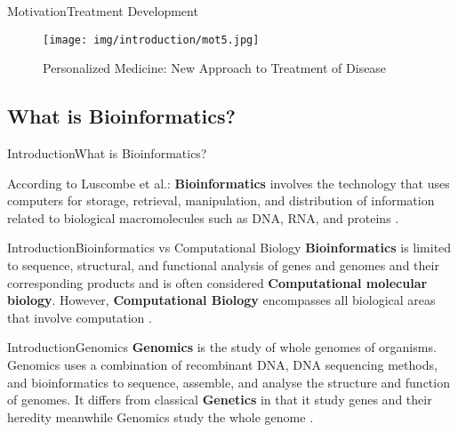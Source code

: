 \documentclass[10pt]{beamer}
\newcommand{\1}{
        	\setbeamertemplate{background}{
        		\texttt{[image: img/1]}
        		\tikz[overlay] \fill[fill opacity=0.75,fill=white] (0,0) rectangle (-\paperwidth,\paperheight);
        	}
}
\begin{document}
\begin{frame}{Motivation}{Treatment Development}
	\begin{figure}[]
		\centering
		\texttt{[image: img/introduction/mot5.jpg]}
		\label{img:mot2}
		\caption{Personalized Medicine: New Approach to Treatment of Disease}
	\end{figure}
\end{frame}

\subsection{What is Bioinformatics?}

\begin{frame}{Introduction}{What is Bioinformatics?}
	
	According to Luscombe et al.: \textbf{Bioinformatics} involves the technology that uses computers for storage, retrieval, manipulation, and distribution of information related to biological macromolecules such as DNA, RNA, and proteins \cite{luscombe2001bioinformatics}.
	
\end{frame}

\begin{frame}{Introduction}{Bioinformatics vs Computational Biology}
	\textbf{Bioinformatics} is limited to sequence, structural, and functional analysis of genes and genomes and their corresponding products and is often considered \textbf{Computational
		molecular biology}. However, \textbf{Computational Biology} encompasses all biological areas that involve computation \cite{xiong2006essential}.
\end{frame}

\begin{frame}{Introduction}{Genomics}
	\textbf{Genomics} is the study of whole genomes of organisms. Genomics uses a combination of recombinant DNA, DNA sequencing methods, and bioinformatics to sequence, assemble, and analyse the structure and function of genomes. It differs from classical \textbf{Genetics} in that it study genes and their heredity meanwhile Genomics study the whole genome  \cite{archibald2018genomics}.
\end{frame}
\end{document}
